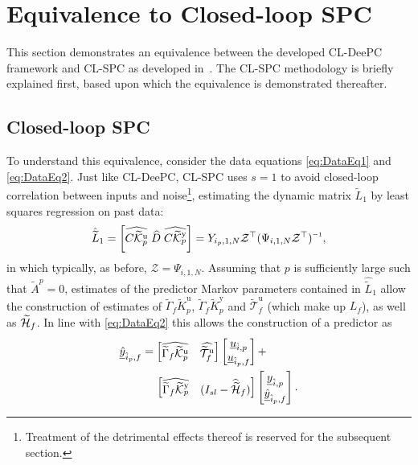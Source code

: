 \section{Equivalence to Closed-loop \acs{SPC}}
This section demonstrates an equivalence between the developed \ac{CL-DeePC} framework and \ac{CL-SPC} as developed in~\cite{Dong2008}. The \ac{CL-SPC} methodology is briefly explained first, based upon which the equivalence is demonstrated thereafter.

\subsection{Closed-loop \ac{SPC}}
To understand this equivalence, consider the data equations \eqref{eq:DataEq1} and \eqref{eq:DataEq2}. Just like \ac{CL-DeePC}, \ac{CL-SPC} uses $s=1$ to avoid closed-loop correlation between inputs and noise\footnote{Treatment of the detrimental effects thereof is reserved for the subsequent section.}, estimating the dynamic matrix $\widetilde{L}_1$ by least squares regression on past data:
\begin{align}\label{eq:CL-SPC-PredMarkov}
\hat{\widetilde{L}}_1 = \left[ \widehat{C\tKp{u}} \; \widehat{D} \; \widehat{C\tKp{y}} \right]=Y_{i_p,1,N}\mathcal{Z}^\top (\Psi_{i,1,N}\mathcal{Z}^\top)\inv,
\end{align}
in which typically, as before, $\mathcal{Z}=\Psi_{i,1,N}$. Assuming that $p$ is sufficiently large such that $\widetilde{A}^p=0$, estimates of the predictor Markov parameters contained in $\hat{\widetilde{L}}_1$ allow the construction of estimates of $\widetilde{\Gamma}_f\widetilde{K}_p^\mathrm{u}$, $\widetilde{\Gamma}_f\widetilde{K}_p^\mathrm{y}$ and $\widetilde{\mathcal{T}}_f^\mathrm{u}$ (which make up $L_f$), as well as $\widetilde{\mathcal{H}}_f$. In line with \eqref{eq:DataEq2} this allows the construction of a predictor as
\begin{align}\label{eq:CL-SPC-pred1}
	\begin{split}
	\underline{\hat{y}}_{\hat{i}_p,f}&= \begin{bmatrix}\widehat{\widetilde{\Gamma}_f\widetilde{\mathcal{K}}_{p}^{\mathrm{{u}}}} & \widehat{\widetilde{\mathcal{T}}_f^\mathrm{u}} \end{bmatrix} 
	\begin{bmatrix}
		\underline{u}_{\hat{i},p}\\
		\underline{u}_{\hat{i}_p,f}
	\end{bmatrix}+\\
	&\phantom{=}\mkern8mu\begin{bmatrix}
		\widehat{\widetilde{\Gamma}_f\widetilde{\mathcal{K}}_{p}^{\mathrm{{y}}}} & (I_{sl}-\widehat{\widetilde{\mathcal{H}}}_f) \end{bmatrix} 
	\begin{bmatrix}
		\underline{y}_{\hat{i},p}\\
		\underline{\hat{y}}_{\hat{i}_p,f}
	\end{bmatrix}.
	\end{split}
\end{align}
